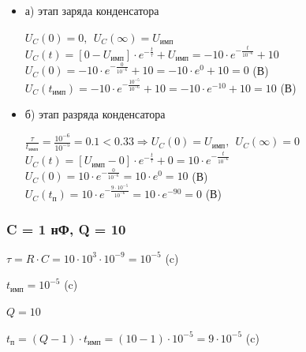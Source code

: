 \begin{itemize}
\item[] а) этап заряда конденсатора

		$U_C(0) = 0,\ \ U_C(\infty) = U_\text{имп}$\\
		$U_C(t) = [0 - U_\text{имп}] \cdot e^{-\frac{t}{\tau}} + U_\text{имп} = -10 \cdot e^{-\frac{t}{10^{-6}}} + 10$\\
		$U_C(0) = -10 \cdot e^{-\frac{0}{10^{-6}}} + 10 = -10 \cdot e^0 + 10 = 0$ (В)\\
		$U_C(t_\text{имп}) = -10 \cdot e^{-\frac{10^{-5}}{10^{-6}}} + 10 = -10 \cdot e^{-10} + 10 = 10$ (В)\\

\item[] б) этап разряда конденсатора
		
		$\frac{\tau}{t_\text{имп}} = \frac{10^{-6}}{10^{-5}} = 0.1 < 0.33 \Rightarrow U_C(0) = U_\text{имп},\ \ U_C(\infty) = 0$\\
		$U_C(t) = [U_\text{имп} - 0] \cdot e^{-\frac{t}{\tau}} + 0 = 10 \cdot e^{-\frac{t}{10^{-6}}}$\\
		$U_C(0) = 10 \cdot e^{-\frac{0}{10^{-6}}} = 10 \cdot e^0 = 10$ (В)\\
		$U_C(t_\text{п}) = 10 \cdot e^{-\frac{9 \cdot 10^{-5}}{10^{-6}}} = 10 \cdot e^{-90} = 0$ (В)\\
		
\end{itemize}

\subsubsection{C = 1 нФ, Q = 10}

		$\tau = R \cdot C = 10 \cdot 10^3 \cdot 10^{-9} = 10^{-5}$ (c)
		
		$t_\text{имп} = 10^{-5}$ (c)
		
		$Q = 10$		
		
		$t_\text{п} = (Q - 1) \cdot t_\text{имп} = (10 - 1) \cdot 10^{-5} = 9 \cdot 10^{-5}$ (c)

